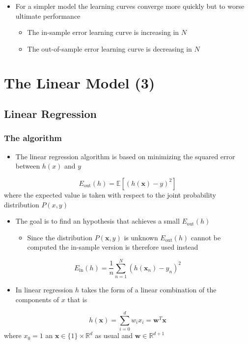 \documentclass[11pt]{article}
\begin{document}
\begin{itemize}
\item For a simpler model the learning curves converge more quickly but to worse ultimate performance
\begin{itemize}
\item The in-sample error learning curve is increasing in \(N\)
\item The out-of-sample error learning curve is decreasing in \(N\)
\end{itemize}
\end{itemize}

\section{The Linear Model (3)}
\label{sec:org636cea2}
\subsection{Linear Regression}
\label{sec:org74ec40d}
\subsubsection{The algorithm}
\label{sec:org8162f98}
\begin{itemize}
\item The linear regression algorithm is based on minimizing the squared error between \(h(x)\) and \(y\)
\end{itemize}
\begin{equation}
  E_\text{out}(h) = \mathbb E[(h(\pmb x) - y)^2]
\end{equation}
where the expected value is taken with respect to the joint probability distribution \(P(x,y)\) 

\begin{itemize}
\item The goal is to find an hypothesis that achieves a small \(E_\text{out}(h)\)
\begin{itemize}
\item Since the distribution \(P(\pmb x, y)\) is unknown \(E_\text{out}(h)\) cannot be computed the in-sample version is therefore used instead
\end{itemize}
\end{itemize}
\begin{equation}
	E_\text{in}(h) = \frac{1}{n}\sum_{n=1}^N(h(\pmb x_n) - y_n)^2
\end{equation}

\begin{itemize}
\item In linear regression \(h\) takes the form of a linear combination of the components of \(x\) that is
\end{itemize}
\begin{equation}
  h(\pmb x) = \sum_{i=0}^dw_ix_i = \pmb w^T\pmb x
\end{equation}
where \(x_0 = 1\) an \(\pmb x \in \{1\} \times \mathbb R ^d\) as usual and \(\pmb w \in \mathbb R^{d+1}\) 
\end{document}

